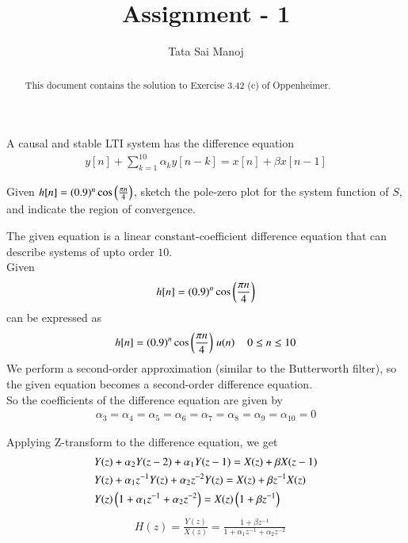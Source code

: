 \documentclass[journal,12pt,twocolumn]{IEEEtran}
\renewcommand\thesection{\arabic{section}}
\begin{document}
\title{Assignment - 1}
\author{Tata Sai Manoj}
\maketitle
\bigskip
\begin{abstract}
This document contains the solution to Exercise 3.42 (c) of Oppenheimer.
\end{abstract}
\problem A causal and stable LTI system has the difference equation
\begin{align}
y[n] + \sum_{k = 1}^{10} \alpha_{k}y[n-k] = x[n] + \beta x[n-1]
\end{align}

Given $h[n] = (0.9)^{n} \cos\left(\frac{\pi n}{4}\right)$, sketch the pole-zero plot for the system function of $S$, and 
indicate the region of convergence. 

\solution
The given equation is a linear constant-coefficient difference equation that can describe systems of upto order $10$. \\
Given 
\begin{align}
h[n] = (0.9)^{n} \cos\left(\frac{\pi n}{4}\right)
\end{align} 
can be expressed as 
\begin{equation}
h[n] = (0.9)^{n} \cos\left(\frac{\pi n}{4}\right) \hspace{0.5mm}u(n)  \hspace{4mm}    0 \leq n \leq 10
\end{equation}
We perform a second-order approximation (similar to the Butterworth filter), so the given equation becomes a second-order 
difference equation. \\ So the coefficients of the difference equation 
are given by 
\begin{align}
\alpha_{3} = \alpha_{4} = \alpha_{5} = \alpha_{6} = \alpha_{7} = \alpha_{8} = \alpha_{9} = \alpha_{10} = 0
\end{align}

Applying Z-transform to the difference equation, we get
\begin{align}
& Y(z) + \alpha_{2}Y(z-2) + \alpha_{1}Y(z-1) = X(z) + \beta X(z-1) \\
& Y(z) + \alpha_{1} z^{-1} Y(z) + \alpha_{2} z^{-2} Y(z) = X(z) + \beta z^{-1} X(z) \\
& Y(z) \left(1 + \alpha_{1} z^{-1} + \alpha_{2} z^{-2}\right) = X(z) \left(1 + \beta z^{-1}\right) 
\end{align}
\begin{align}
& H(z) = \frac{Y(z)}{X(z)} = \frac{1 + \beta z^{-1}}{1 + \alpha_{1} z^{-1} + \alpha_{2} z^{-2}} 
\end{align}
\end{document}
